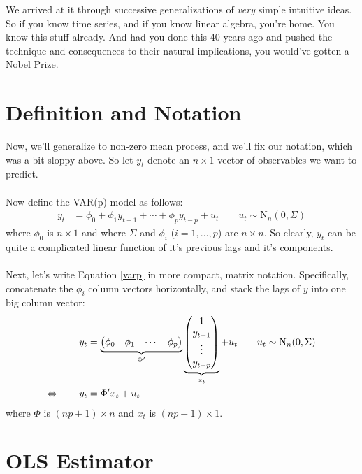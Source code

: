 \documentclass[a4paper,12pt]{scrartcl}
\begin{document}
We arrived at it through successive generalizations
of \emph{very} simple intuitive ideas. So if you know
time series, and if you know linear algebra, you're home.
You know this stuff already. And had you done this 40 years
ago and pushed the technique and consequences
to their natural implications, you would've gotten a Nobel 
Prize. 


\newpage
\section{Definition and Notation}

Now, we'll generalize to non-zero mean process, and 
we'll fix our notation, which was a bit
sloppy above.  So let $y_t$ denote
an $n\times 1$ vector of observables we
want to predict.  
\\
\\
Now define the VAR(p) model as follows:
\begin{align}
    \label{varp}
    y_t &= \phi_0 + \phi_1 y_{t-1} + \cdots + 
	\phi_p y_{t-p} + u_{t} 
	\qquad u_t \sim \text{N}_n(0, \Sigma)
\end{align}
where $\phi_0$ is $n\times 1$ and where $\Sigma$ and
$\phi_i$ ($i = 1, \ldots, p$) are $n\times n$.
So clearly, $y_t$ can be quite a complicated linear
function of it's previous lags and it's components.
\\
\\
Next, let's write Equation \ref{varp} in more
compact, matrix notation.  Specifically, concatenate
the $\phi_i$ column vectors horizontally, and stack the lags 
of $y$ into one big column vector:
\begin{align} 
    y_t &= \underbrace{\begin{pmatrix} \phi_0 & \phi_1 & \cdots 
	& \phi_p \end{pmatrix}}_{\Phi'}
	\underbrace{\begin{pmatrix} 
	    1 \\ y_{t-1} \\ \vdots \\ y_{t-p}
	\end{pmatrix}}_{x_t} + u_t \qquad u_t \sim \text{N}_n(0, \Sigma) 
	 \notag \\
    \Leftrightarrow \qquad y_t &= \Phi' x_t + u_t 
    \label{varvec}
\end{align} 
where $\Phi$ is $(np +1) \times n$ and $x_t$ is 
$(np+1) \times 1$.


\section{OLS Estimator}
\end{document}
